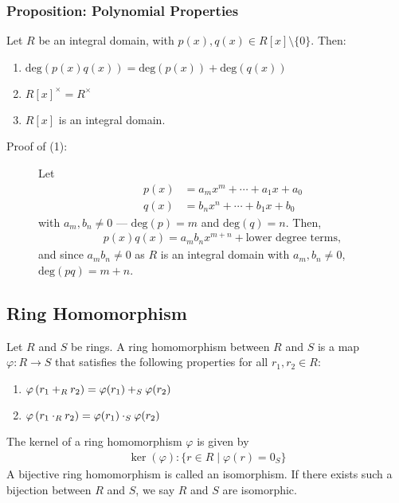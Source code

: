 \documentclass[10pt]{extarticle}
\begin{document}
  \subsubsection{Proposition: Polynomial Properties}%
  Let $R$ be an integral domain, with $p(x),q(x)\in R[x]\setminus\{0\}$. Then:
  \begin{enumerate}[(1)]
    \item $\text{deg}(p(x)q(x)) = \text{deg}(p(x)) + \text{deg}(q(x))$
    \item $R[x]^{\times} = R^{\times}$
    \item $R[x]$ is an integral domain.
  \end{enumerate}
  \begin{description}
    \item[Proof of (1):] Let
      \begin{align*}
        p(x) &= a_mx^m + \cdots + a_1x + a_0\\
        q(x) &= b_nx^n + \cdots + b_1x + b_0
      \end{align*}
      with $a_m,b_n\neq 0$ --- $\text{deg}(p) = m$ and $\text{deg}(q) = n$. Then,
      \begin{align*}
        p(x)q(x) = a_mb_nx^{m+n} + \text{lower degree terms},
      \end{align*}
      and since $a_mb_n\neq 0$ as $R$ is an integral domain with $a_m,b_n\neq 0$, $\text{deg}(pq) = m+n$.
  \end{description}
  \subsection{Ring Homomorphism}%
  Let $R$ and $S$ be rings. A ring homomorphism between $R$ and $S$ is a map $\varphi: R\rightarrow S$ that satisfies the following properties for all $r_1,r_2\in R$:
  \begin{enumerate}[(1)]
    \item $\displaystyle\varphi\left(r_1 +_{\tiny R} r_2\right) = \varphi(r_1) +_{\tiny S} \varphi(r_2)$
    \item $\displaystyle\varphi \left(r_1 \cdot_{\tiny R} r_2\right) = \varphi(r_1) \cdot_{\tiny S} \varphi(r_2)$
  \end{enumerate}
  The kernel of a ring homomorphism $\varphi$ is given by
  \begin{align*}
    \ker(\varphi): \{r\in R\mid \varphi(r) = 0_S\}
  \end{align*}
  A bijective ring homomorphism is called an isomorphism. If there exists such a bijection between $R$ and $S$, we say $R$ and $S$ are isomorphic.\\
\end{document}
